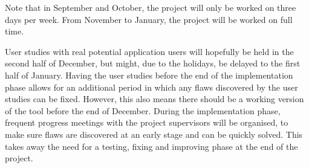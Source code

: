 \noindent
Note that in September and October, the project will only be worked on three days per week. From November to January, the project will be worked on full time.

User studies with real potential application users will hopefully be held in the second half of December, but might, due to the holidays, be delayed to the first half of January. Having the user studies before the end of the implementation phase allows for an additional period in which any flaws discovered by the user studies can be fixed. However, this also means there should be a working version of the tool before the end of December. During the implementation phase, frequent progress meetings with the project supervisors will be organised, to make sure flaws are discovered at an early stage and can be quickly solved. This takes away the need for a testing, fixing and improving phase at the end of the project.
